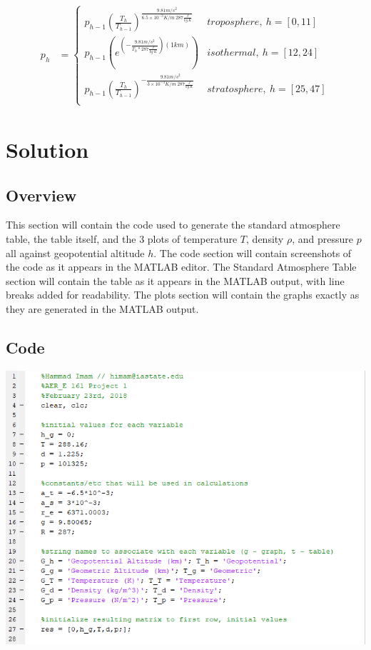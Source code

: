 \documentclass{article}
\begin{document}
\begin{align}
    p_h &= \begin{cases}
    p_{h-1}{\left(\frac{T_h}{T_{h-1}}\right)}^{\frac{9.81 m/s^2}{6.5\times10^{-3}K/m\ 287 \frac{J}{kg\ K}}}    & troposphere,\ h = [0,11] \\
    p_{h-1}\left(e^{\left(- \frac{9.81 m/s^2}{T_h * 287 \frac{J}{kg\ K} }\right)\left(1 km\right)}\right)                                          & isothermal,\ h = [12,24] \\
    p_{h-1}{\left(\frac{T_h}{T_{h-1}}\right)}^{-\frac{9.81 m/s^2}{3\times10^{-3}K/m\ 287 \frac{J}{kg\ K}}}       & stratosphere,\ h = [25,47] \\
    \end{cases}
\end{align}


\section{Solution}

\subsection{Overview}

This section will contain the code used to generate the standard atmosphere table, the table itself, and the 3 plots of temperature $T$, density $\rho$, and pressure $p$ all against geopotential altitude $h$. The code section will contain screenshots of the code as it appears in the MATLAB editor. The Standard Atmosphere Table section will contain the table as it appears in the MATLAB output, with line breaks added for readability. The plots section will contain the graphs exactly as they are generated in the MATLAB output.

\subsection{Code}
\includegraphics [width=\linewidth]{code1.png}
\end{document}
